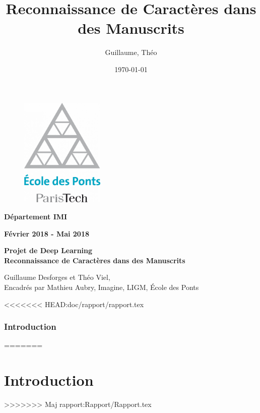 \documentclass{article}
\title{Reconnaissance de Caractères dans des Manuscrits}
\date{\today}
\author{\bsc{Desforges} Guillaume, \bsc{Viel} Théo}
\begin{document}
\thispagestyle{empty}
\begin{center}

    \begin{figure}[!htb]
        \begin{center}
            \includegraphics[width=4cm]{logo_enpc.png}
        \end{center}
    \end{figure}

    \vspace{0.5cm}

    {\large{\bf Département IMI}}

    \vspace{0.2cm}

    {\large{\bf Février 2018 - Mai 2018}}

    \vspace{1.5cm}

    \large{ \bf Projet de Deep Learning}\\
    \vspace{0.2cm}
    {\Large{\bf Reconnaissance de Caractères dans des Manuscrits}}

    \vspace{1cm}

    \large{Guillaume Desforges et Théo Viel},\\
    \vspace{0.2cm}
    \large{Encadrés par Mathieu Aubry, Imagine, LIGM, École des Ponts}

\end{center}
\newpage

\tableofcontents
\appendix
\newpage 

<<<<<<< HEAD:doc/rapport/rapport.tex
\section{Introduction}
=======

\newpage 

\part{Introduction}
>>>>>>>  Maj rapport:Rapport/Rapport.tex
\end{document}
